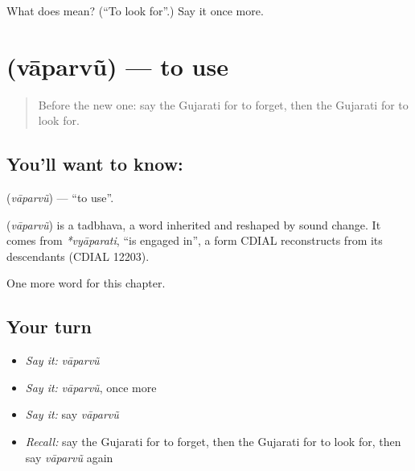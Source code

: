 \begin{tcolorbox}[breakable,colback=teal!4,colframe=teal!35!black,title={Before you move on}]
What does  mean? (\textquotedblleft{}To look for\textquotedblright{}.) Say it once more.
\end{tcolorbox}
\section[\texorpdfstring{\gu{વાપરવું} (vāparvũ)}{વાપરવું (vāparvũ)}]{ (vāparvũ) — to use}

\label{lesson:GU-C139-vaparvu}



\begin{quote}
Before the new one: say the Gujarati for to forget, then the Gujarati for to look for.
\end{quote}

\subsection*{You'll want to know: }
\textbf{} (\emph{vāparvũ}) — \textquotedblleft{}to use\textquotedblright{}.

\begin{cousinweb}
\textbf{} (\emph{vāparvũ}) is a tadbhava, a word inherited and reshaped by sound change. It comes from \emph{*vyāparati}, \textquotedblleft{}is engaged in\textquotedblright{}, a form CDIAL reconstructs from its descendants (CDIAL 12203).
\end{cousinweb}

\begin{grammarlens}[title={What you've built}]
One more word for this chapter.
\end{grammarlens}

\subsection*{Your turn}
\begin{itemize}
\raggedright
  \item \emph{Say it:} \emph{vāparvũ}
  \item \emph{Say it:} \emph{vāparvũ}, once more
  \item \emph{Say it:} say \emph{vāparvũ}
  \item \emph{Recall:} say the Gujarati for to forget, then the Gujarati for to look for, then say \emph{vāparvũ} again
\end{itemize}

